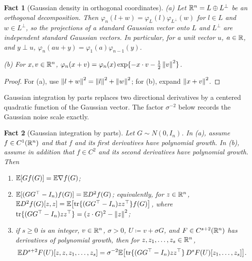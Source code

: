 \documentclass[11pt,letterpaper]{article}
\theoremstyle{plain}
\newtheorem{fact}{Fact}[section]
\begin{document}
\begin{fact}[Gaussian density in orthogonal coordinates]\label{tb:gauss-coord}
(a) Let \(\mathbb R^n=L\oplus L^\perp\) be an orthogonal decomposition. Then
\(\varphi_n(l+w)=\varphi_L(l)\varphi_{L^\perp}(w)\) for \(l\in L\) and
\(w\in L^\perp\), so the projections of a standard Gaussian vector onto
\(L\) and \(L^\perp\) are independent standard Gaussian vectors. In
particular, for a unit vector \(u\), \(a\in\mathbb R\), and \(y\perp u\),
\(\varphi_n(au+y)=\varphi_1(a)\varphi_{n-1}(y)\).

(b) For \(x,v\in\mathbb R^n\),
\(\varphi_n(x+v)=\varphi_n(x)\exp\{-x\cdot v-\tfrac12\left\lVert v\right\rVert^2\}\).
\end{fact}

\begin{proof}
For (a), use \(\left\lVert l+w\right\rVert^2=\left\lVert l\right\rVert^2+\left\lVert w\right\rVert^2\); for (b), expand
\(\left\lVert x+v\right\rVert^2\).
\end{proof}


Gaussian integration by parts replaces two directional derivatives by
a centered quadratic function of the Gaussian vector. The factor
\(\sigma^{-2}\) below records the Gaussian noise scale exactly.

\begin{fact}[Gaussian integration by parts]\label{tb:stein}
Let \(G\sim N(0,I_n)\). In (a), assume \(f\in C^1(\mathbb R^n)\) and
that \(f\) and its first derivatives have polynomial growth.
In (b), assume in addition that \(f\in C^2\) and its second
derivatives have polynomial growth. Then
\begin{enumerate}
\item[(a)] \(\mathbb E[Gf(G)]=\mathbb E\nabla f(G)\);
\item[(b)] \(\mathbb E[(GG^\top-I_n)f(G)]=\mathbb E D^2f(G)\); equivalently, for \(z\in\mathbb R^n\),
\(\mathbb E D^2f(G)[z,z]=\mathbb E\bigl[\operatorname{tr}\{(GG^\top-I_n)zz^\top\}f(G)\bigr]\), where
\(\operatorname{tr}\{(GG^\top-I_n)zz^\top\}=(z\cdot G)^2-\left\lVert z\right\rVert^2\);
\item[(c)] if \(s\ge0\) is an integer, \(v\in\mathbb R^n\), \(\sigma>0\),
\(U\coloneqq v+\sigma G\), and
\(F\in C^{s+2}(\mathbb R^n)\) has derivatives of polynomial growth, then for
\(z,z_1,\ldots,z_s\in\mathbb R^n\),
\[
 \mathbb E D^{s+2}F(U)[z,z,z_1,\ldots,z_s]
 =\sigma^{-2}\mathbb E\bigl[\operatorname{tr}\{(GG^\top-I_n)zz^\top\}\,
 D^sF(U)[z_1,\ldots,z_s]\bigr].
\]
\end{enumerate}
\end{fact}
\end{document}
